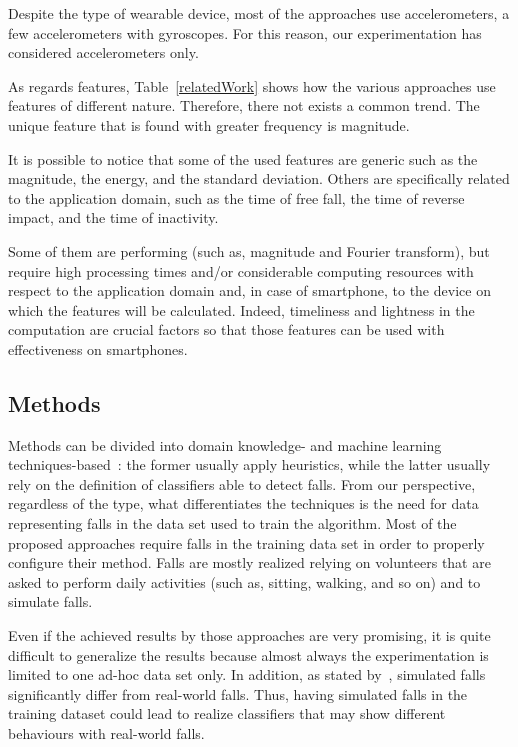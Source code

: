 \documentclass[twocolumn]{svjour3}          \smartqed  \usepackage[draft]{hyperref}
\begin{document}
Despite the type of wearable device, most of the approaches use accelerometers, a few accelerometers with gyroscopes. For this reason, our experimentation has considered accelerometers only.

As regards features, Table~\ref{relatedWork} shows how the various approaches use features of different nature. Therefore, there not exists a common trend. The unique feature that is found with greater frequency is magnitude.

It is possible to notice that some of the used features are generic such as the magnitude, the energy, and the standard deviation. Others are specifically related to the application domain, such as the time of free fall, the time of reverse impact, and the time of inactivity.

Some of them are performing (such as, magnitude and Fourier transform), but require high processing times and/or considerable computing resources with respect to the application domain and, in case of smartphone, to the device on which the features will be calculated. Indeed, timeliness and lightness in the computation are crucial factors so that those features can be used with effectiveness on smartphones.

\subsection{Methods}
Methods can be divided into domain knowledge- and machine learning techniques-based~\citep{mirchevska_combining_2014}: the former usually apply heuristics, while the latter usually rely on the definition of classifiers able to detect falls. From our perspective, regardless of the type, what differentiates the techniques is the need for data representing falls in the data set used to train the algorithm. Most of the proposed approaches require falls in the training data set in order to properly configure their method. Falls are mostly realized relying on volunteers that are asked to perform daily activities (such as, sitting, walking, and so on) and to simulate falls.

Even if the achieved results by those approaches are very promising, it is quite difficult to generalize the results because almost always the experimentation is limited to one ad-hoc data set only. In addition, as stated by~\citet{klenk_comparison_2011}, simulated falls significantly differ from real-world falls. Thus, having simulated falls in the training dataset could lead to realize classifiers that may show different behaviours with real-world falls.
\end{document}
